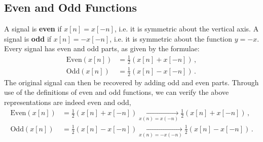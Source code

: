 \subsection{Even and Odd Functions}
%
A signal is \textbf{even} if $x[n] = x[-n]$, i.e. it is symmetric about the vertical axis.
A signal is \textbf{odd} if $x[n] = -x[-n]$, i.e. it is symmetric about the function $y = -x$.
Every signal has even and odd parts, as given by the formulae:
%
\begin{align}
  \mathrm{Even}(x[n]) &= \frac{1}{2}(x[n] + x[-n]) \,, \\
  \mathrm{Odd}(x[n]) &= \frac{1}{2}(x[n] - x[-n])  \,.
\end{align}
%
The original signal can then be recovered by adding odd and even parts. Through use of the
definitions of even and odd functions, we can verify the above representations are indeed
even and odd,
%
\begin{align*}
  \mathrm{Even}(x[n]) &= \frac{1}{2}(x[n] + x[-n]) \xrightarrow[x(n)=x(-n)]{} \frac{1}{2}(x[n] + x[-n]) \,, \\
  \mathrm{Odd}(x[n]) &= \frac{1}{2}(x[n] - x[-n]) \xrightarrow[x(n)=-x(-n)]{} \frac{1}{2}(x[n] - x[-n]) \,.
\end{align*}


